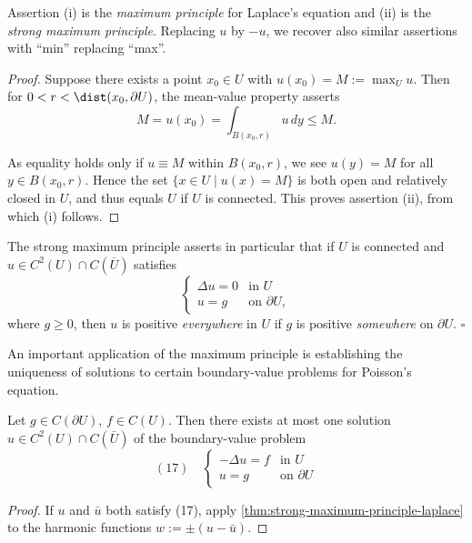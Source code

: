 Assertion (i) is the \textit{maximum principle} for Laplace's equation and (ii) is the \textit{strong maximum principle}. Replacing $u$ by $-u$, we recover also similar assertions with ``min'' replacing ``max''.

\begin{proof}
Suppose there exists a point $x_0 \in U$ with $u(x_0) = M := \max_U u$. Then for $0 < r < \dist(x_0, \partial U)$, the mean-value property asserts
$$M = u(x_0) = \int_{B(x_0,r)} u \, dy \leq M.$$

As equality holds only if $u \equiv M$ within $B(x_0, r)$, we see $u(y) = M$ for all $y \in B(x_0,r)$. Hence the set $\{x \in U \mid u(x) = M\}$ is both open and relatively closed in $U$, and thus equals $U$ if $U$ is connected. This proves assertion (ii), from which (i) follows.
\end{proof}

\begin{remark}
\label{rem:strong-maximum-principle-positivity}
The strong maximum principle asserts in particular that if $U$ is connected and $u \in C^2(U) \cap C(\overline{U})$ satisfies
$$\begin{cases} \Delta u = 0 & \text{in } U \\ u = g & \text{on } \partial U, \end{cases}$$
where $g \geq 0$, then $u$ is positive \textit{everywhere} in $U$ if $g$ is positive \textit{somewhere} on $\partial U$. $\square$
\end{remark}

An important application of the maximum principle is establishing the uniqueness of solutions to certain boundary-value problems for Poisson's equation.

\begin{theorem}[Uniqueness]
\label{thm:uniqueness-poisson-dirichlet}
Let $g \in C(\partial U)$, $f \in C(U)$. Then there exists at most one solution $u \in C^2(U) \cap C(\bar{U})$ of the boundary-value problem
$$(17) \quad \begin{cases}
-\Delta u = f & \text{in } U \\
u = g & \text{on } \partial U
\end{cases}$$
\end{theorem}

\begin{proof}
If $u$ and $\bar{u}$ both satisfy (17), apply \cref{thm:strong-maximum-principle-laplace} to the harmonic functions $w := \pm(u - \bar{u})$.
\end{proof}

